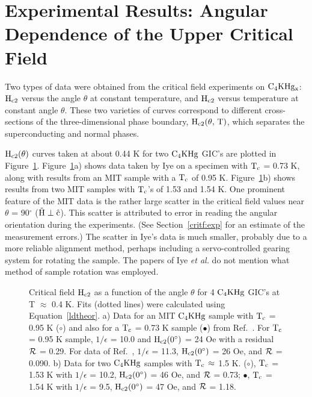 \section{Experimental Re\-sults: An\-gu\-lar De\-pen\-dence of the Upp\-er Critical Field}
\label{angdata}

	Two types of data were obtained from the critical field experiments
on  $\rm  C_4KHg_x$: $\rm H_{c2}$   versus the angle  $\theta$  at constant
temperature,  and  $\rm    H_{c2}$  versus  temperature   at constant angle
$\theta$.   These    two  varieties  of   curves  correspond   to different
cross-sections of the three-dimensional phase boundary, $\rm H_{c2}(\theta,
\, T)$, which separates the superconducting and normal phases.

	$\rm  H_{c2}(\theta)$ curves taken  at  about 0.44  K for  two $\rm
C_4KHg$      GIC's   are         plotted     in      Figure~\ref{hc2theta}.
Figure~\ref{hc2theta}a)  shows data taken  by Iye on a  specimen  with $\rm
T_c$ = 0.73 K, along with results from  an  MIT sample with  a $\rm T_c$ of
0.95 K.   Figure~\ref{hc2theta}b)  shows results from two MIT  samples with
$\rm T_c$'s of 1.53 and 1.54 K.  One  prominent feature of  the MIT data is
the rather large   scatter in the critical  field  values near $\theta$   =
90$^{\circ}$ ($\rm \vec{H} \perp \hat{c}$).  This scatter is  attributed to
error  in reading the angular  orientation  during  the experiments.   (See
Section~\ref{critf:exp} for an estimate  of  the measurement errors.)   The
scatter in  Iye's  data is much smaller,   probably due to a more  reliable
alignment method, perhaps  including a  servo-controlled gearing system for
rotating the sample.  The papers of Iye  {\em et  al.}  do not mention what
method of sample rotation was employed.

\begin{figure}
\vspace{7.5in}
\caption[Critical field $\rm H_{c2}$ as a function of the angle
$\theta$ for  $\rm C_4KHg$.]{Critical  field $\rm H_{c2}$  as a function of
the angle  $\theta$ for  4 $\rm  C_4KHg$ GIC's at T $\approx$  0.4 K.  Fits
(dotted lines) were  calculated using Equation~\ref{ldtheor}.   a) Data for
an MIT $\rm C_4KHg$ sample with  $\rm T_c$  =  0.95 K ($\circ$) and also
for a $\rm T_c$ = 0.73 K sample ($\bullet$) from Ref.~\cite{tanuma81}.  For
$\rm T_c$ = 0.95 K sample, $1/\epsilon$  = 10.0 and $\rm H_{c2}(0^{\circ})$
= 24 Oe with a residual $\cal R$ = 0.29.  For data  of Ref.~\cite{tanuma81},
$1/\epsilon$ = 11.3, $\rm H_{c2}(0^{\circ})$ = 26 Oe, and $\cal R$  = 0.090.
b)  Data for two $\rm  C_4KHg$ samples  with  $\rm  T_c \,  \approx$ 1.5 K.
($\circ$),  $\rm   T_c$  =   1.53  K  with   $1/\epsilon$  =    10.2, $\rm
H_{c2}(0^{\circ})$ = 46 Oe, and $\cal R$ = 0.73; $\bullet$, $\rm T_c$ = 1.54
K with $1/\epsilon$ = 9.5, $\rm H_{c2}(0^{\circ})$ = 47 Oe, and $\cal R$
= 1.18.}
\label{hc2theta}
\end{figure}

